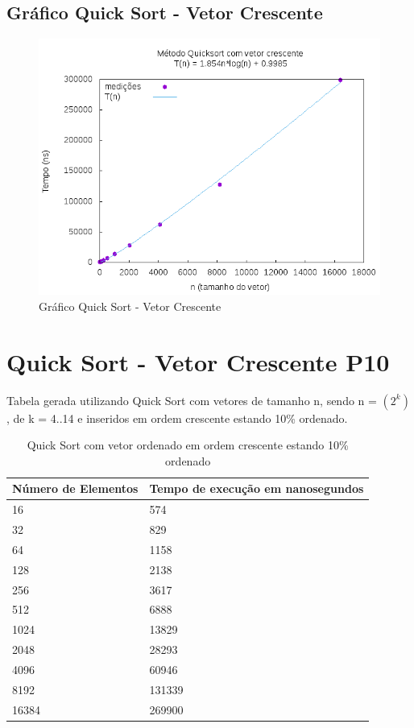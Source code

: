\documentclass[12pt,a4paper,twoside]{report}
\begin{document}
\subsection{Gráfico Quick Sort - Vetor Crescente}
\begin{figure}[H]
    \centering
    \includegraphics[width=0.7\linewidth]{graficos/QuickSort/vIntCrescente/vIntCrescente.png}
  \caption{Gráfico Quick Sort - Vetor Crescente}
\end{figure}

\section{Quick Sort - Vetor Crescente P10}
Tabela gerada utilizando Quick Sort com vetores de tamanho n, sendo n = $(2^k)$, de k = 4..14 e inseridos em ordem crescente estando 10\% ordenado.
\begin{table}[H]
\centering
\caption{Quick Sort com vetor ordenado em ordem crescente estando 10\% ordenado}
\label{my-label}
\begin{tabular}{|l|l|}
\hline
\multicolumn{1}{|c|}{\textbf{Número de Elementos}} & \multicolumn{1}{c|}{\textbf{Tempo de execução em nanosegundos}} \\ \hline
16 & 574 \\ \hline
32 & 829 \\ \hline
64 & 1158 \\ \hline
128 & 2138 \\ \hline
256 & 3617 \\ \hline
512 & 6888 \\ \hline
1024 & 13829 \\ \hline
2048 & 28293 \\ \hline
4096 & 60946 \\ \hline
8192 & 131339 \\ \hline
16384 & 269900 \\ \hline
\end{tabular}
\end{table}
\end{document}
